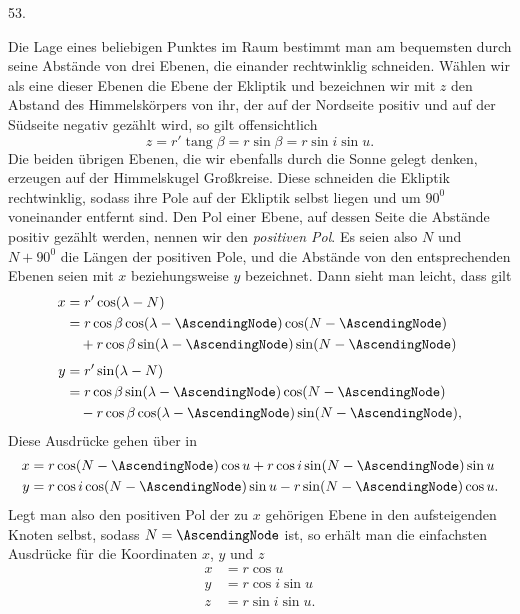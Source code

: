 \par\medskip
\hypertarget{native-070-article053}{}
\begin{center}53.\end{center}
Die Lage eines beliebigen Punktes im Raum bestimmt man am bequemsten durch seine Abstände von drei Ebenen, die einander rechtwinklig schneiden. Wählen wir als eine dieser Ebenen die Ebene der Ekliptik und bezeichnen wir mit $z$ den Abstand des Himmelskörpers von ihr, der auf der Nordseite positiv und auf der Südseite negativ gezählt wird, so gilt offensichtlich
\[
z=r'\operatorname{tang}\beta=r\sin\beta=r\sin i\sin u.
\]
Die beiden übrigen Ebenen, die wir ebenfalls durch die Sonne gelegt denken, erzeugen auf der Himmelskugel Großkreise. Diese schneiden die Ekliptik rechtwinklig, sodass ihre Pole auf der Ekliptik selbst liegen und um $90^0$ voneinander entfernt sind. Den Pol einer Ebene, auf dessen Seite die Abstände positiv gezählt werden, nennen wir den \textit{positiven Pol}. Es seien also $N$ und $N+90^0$ die Längen der positiven Pole, und die Abstände von den entsprechenden Ebenen seien mit $x$ beziehungsweise $y$ bezeichnet. Dann sieht man leicht, dass gilt
\[
\begin{aligned}
x&=r'\cos(\lambda-N)\\
&=r\cos\beta\cos(\lambda-\AscendingNode)\cos(N-\AscendingNode)\\
&\quad+r\cos\beta\sin(\lambda-\AscendingNode)\sin(N-\AscendingNode)\\[.4em]
y&=r'\sin(\lambda-N)\\
&=r\cos\beta\sin(\lambda-\AscendingNode)\cos(N-\AscendingNode)\\
&\quad-r\cos\beta\cos(\lambda-\AscendingNode)\sin(N-\AscendingNode),
\end{aligned}
\]
Diese Ausdrücke gehen über in
\[
\begin{aligned}
x&=r\cos(N-\AscendingNode)\cos u+r\cos i\sin(N-\AscendingNode)\sin u\\
y&=r\cos i\cos(N-\AscendingNode)\sin u-r\sin(N-\AscendingNode)\cos u.
\end{aligned}
\]
Legt man also den positiven Pol der zu $x$ gehörigen Ebene in den aufsteigenden Knoten selbst, sodass $N=\AscendingNode$ ist, so erhält man die einfachsten Ausdrücke für die Koordinaten $x$, $y$ und $z$
\[
\begin{aligned}
x&=r\cos u\\
y&=r\cos i\sin u\\
z&=r\sin i\sin u.
\end{aligned}
\]

